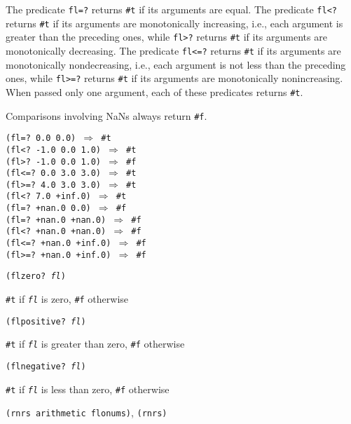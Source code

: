 The predicate \texttt{fl=?} returns \texttt{\#{}t} if its arguments are equal.
The predicate \texttt{fl\textless{}?} returns \texttt{\#{}t} if its arguments are monotonically
increasing, i.e., each argument is greater than the preceding ones,
while \texttt{fl\textgreater{}?} returns \texttt{\#{}t} if its arguments are monotonically decreasing.
The predicate \texttt{fl\textless{}=?} returns \texttt{\#{}t} if its arguments are monotonically
nondecreasing, i.e., each argument is not less than the preceding ones,
while \texttt{fl\textgreater{}=?} returns \texttt{\#{}t} if its arguments are monotonically nonincreasing.
When passed only one argument, each of these predicates returns \texttt{\#{}t}.


Comparisons involving NaNs always return \texttt{\#{}f}.


\begin{alltt}
(fl=? 0.0 0.0) \(\Rightarrow\) \#{}t
(fl\textless{}? -1.0 0.0 1.0) \(\Rightarrow\) \#{}t
(fl\textgreater{}? -1.0 0.0 1.0) \(\Rightarrow\) \#{}f
(fl\textless{}=? 0.0 3.0 3.0) \(\Rightarrow\) \#{}t
(fl\textgreater{}=? 4.0 3.0 3.0) \(\Rightarrow\) \#{}t
(fl\textless{}? 7.0 +inf.0) \(\Rightarrow\) \#{}t
(fl=? +nan.0 0.0) \(\Rightarrow\) \#{}f
(fl=? +nan.0 +nan.0) \(\Rightarrow\) \#{}f
(fl\textless{}? +nan.0 +nan.0) \(\Rightarrow\) \#{}f
(fl\textless{}=? +nan.0 +inf.0) \(\Rightarrow\) \#{}f
(fl\textgreater{}=? +nan.0 +inf.0) \(\Rightarrow\) \#{}f
\end{alltt}

\begin{description}

\label{objects_s179}\item[procedure] \texttt{(flzero? \textit{fl})}



\item[returns] \texttt{\#{}t} if \texttt{\textit{fl}} is zero, \texttt{\#{}f} otherwise


\item[procedure] \texttt{(flpositive? \textit{fl})}



\item[returns] \texttt{\#{}t} if \texttt{\textit{fl}} is greater than zero, \texttt{\#{}f} otherwise


\item[procedure] \texttt{(flnegative? \textit{fl})}



\item[returns] \texttt{\#{}t} if \texttt{\textit{fl}} is less than zero, \texttt{\#{}f} otherwise


\item[libraries] \texttt{(rnrs arithmetic flonums)}, \texttt{(rnrs)}
\end{description}

